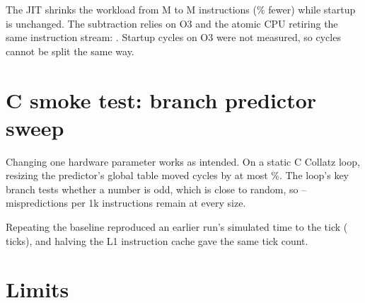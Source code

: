 \documentclass[11pt]{article}
\providecommand{\GeneratedDir}{../build/report/generated}
\begin{document}
The JIT shrinks the workload from \WorkMDefault M to \WorkMJitOn M instructions (\JitWorkSavingPct\% fewer) while startup is unchanged.
The subtraction relies on O3 and the atomic CPU retiring the same instruction stream: \InstStreamNote.
Startup cycles on O3 were not measured, so cycles cannot be split the same way.

\begin{table}[H]
\centering\small

\caption{Engine counters on the O3 baseline.}
\label{tab:counters}
\end{table}

\section{C smoke test: branch predictor sweep}

Changing one hardware parameter works as intended.
On a static C Collatz loop, resizing the predictor's global table moved cycles by at most \CSweepMaxDeltaPct\%.
The loop's key branch tests whether a number is odd, which is close to random, so \CSweepMPKIMin--\CSweepMPKIMax{} mispredictions per 1k instructions remain at every size.

\begin{table}[H]
\centering\small

\caption{One-factor sweep of \texttt{globalPredictorSize}. Every run executed exactly \CSweepInsts{} instructions.}
\end{table}

Repeating the baseline reproduced an earlier run's simulated time to the tick (\CBaselineTicks{} ticks), and halving the L1 instruction cache gave the same tick count.

\section{Limits}
\label{sec:limits}
\end{document}
